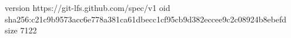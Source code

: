 version https://git-lfs.github.com/spec/v1
oid sha256:c21c9b9573acc6e778a381ca61dbecc1cf95cb9d382eccee9c2c08924b8ebefd
size 7122
